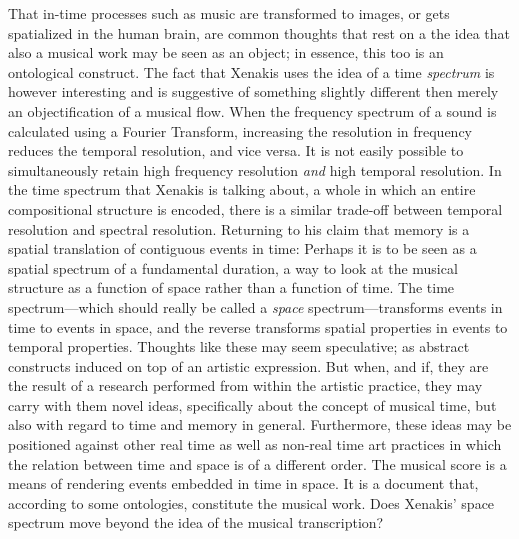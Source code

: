 That in-time processes such as music are transformed to images, or gets spatialized in the human brain, are common thoughts that rest on a the idea that also a musical work may be seen as an object; in essence, this too is an ontological construct.
The fact that Xenakis uses the idea of a time \emph{spectrum} is however interesting and is suggestive of something slightly different then merely an objectification of a musical flow. When the frequency spectrum of a sound is calculated using a Fourier Transform, increasing the resolution in frequency reduces the temporal resolution, and vice versa. It is not easily possible to simultaneously retain high frequency resolution \emph{and} high temporal resolution. In the time spectrum that Xenakis is talking about, a whole in which an entire compositional structure is encoded, there is a similar trade-off between temporal resolution and spectral resolution. Returning to his claim that memory is a spatial translation of contiguous events in time: Perhaps it is to be seen as a spatial spectrum of a fundamental duration, a way to look at the musical structure as a function of space rather than a function of time. The time spectrum---which should really be called a \emph{space} spectrum---transforms events in time to events in space, and the reverse transforms spatial properties in events to temporal properties. Thoughts like these may seem speculative; as abstract constructs induced on top of an artistic expression. But when, and if, they are the result of a research performed from within the artistic practice, they may carry with them novel ideas, specifically about the concept of musical time, but also with regard to time and memory in general. Furthermore, these ideas may be positioned against other real time as well as non-real time art practices in which the relation between time and space is of a different order. The musical score is a means of rendering events embedded in time in space. It is a document that, according to some ontologies, constitute the musical work. Does Xenakis' space spectrum move beyond the idea of the musical transcription? 

